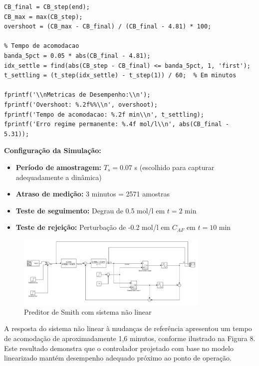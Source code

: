 \documentclass[a4paper,12pt]{article}
\begin{document}
\begin{lstlisting}[caption=Implementacao do Preditor de Smith Discreto]
% Overshoot
CB_final = CB_step(end);
CB_max = max(CB_step);
overshoot = (CB_max - CB_final) / (CB_final - 4.81) * 100;

% Tempo de acomodacao
banda_5pct = 0.05 * abs(CB_final - 4.81);
idx_settle = find(abs(CB_step - CB_final) <= banda_5pct, 1, 'first');
t_settling = (t_step(idx_settle) - t_step(1)) / 60;  % Em minutos

fprintf('\\nMetricas de Desempenho:\\n');
fprintf('Overshoot: %.2f%%\\n', overshoot);
fprintf('Tempo de acomodacao: %.2f min\\n', t_settling);
fprintf('Erro regime permanente: %.4f mol/l\\n', abs(CB_final - 5.31));
\end{lstlisting}

\textbf{Configuração da Simulação:}
\begin{itemize}
\item \textbf{Período de amostragem:} $T_s = 0.07$ s (escolhido para capturar adequadamente a dinâmica)
\item \textbf{Atraso de medição:} 3 minutos = 2571 amostras
\item \textbf{Teste de seguimento:} Degrau de 0.5 mol/l em $t = 2$ min
\item \textbf{Teste de rejeição:} Perturbação de -0.2 mol/l em $C_{AF}$ em $t = 10$ min
\end{itemize}

\begin{figure}[H]
  \centering
  \includegraphics[width=0.82\textwidth]{figure5.png}
  \caption{Preditor de Smith com sistema não linear}
  \end{figure}

A resposta do sistema não linear à mudanças de referência apresentou um tempo de acomodação de aproximadamente 1,6 minutos, conforme ilustrado na Figura 8. Este resultado demonstra que o controlador projetado com base no modelo linearizado mantém desempenho adequado próximo ao ponto de operação.
\end{document}
